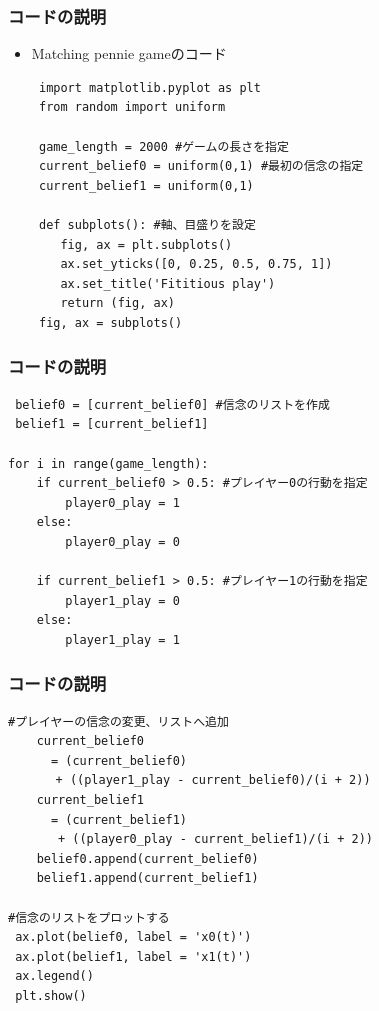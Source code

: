 \documentclass[dvipdfmx,fleqn]{beamer}
\begin{document}
\begin{frame}[containsverbatim]%
\frametitle{コードの説明}
\begin{itemize}\setlength{\parskip}{0.5em}
\item
Matching pennie gameのコード
\begin{verbatim}
 import matplotlib.pyplot as plt
 from random import uniform

 game_length = 2000 #ゲームの長さを指定
 current_belief0 = uniform(0,1) #最初の信念の指定
 current_belief1 = uniform(0,1)

 def subplots(): #軸、目盛りを設定
    fig, ax = plt.subplots()
    ax.set_yticks([0, 0.25, 0.5, 0.75, 1])
    ax.set_title('Fititious play')
    return (fig, ax)
 fig, ax = subplots() 

\end{verbatim}
\end{itemize}
\end{frame}

\begin{frame}[containsverbatim]
\frametitle{コードの説明}

\begin{verbatim}
 belief0 = [current_belief0] #信念のリストを作成
 belief1 = [current_belief1]

for i in range(game_length):
    if current_belief0 > 0.5: #プレイヤー0の行動を指定
        player0_play = 1
    else:
        player0_play = 0

    if current_belief1 > 0.5: #プレイヤー1の行動を指定
        player1_play = 0
    else:
        player1_play = 1
\end{verbatim}

\end{frame}


\begin{frame}[containsverbatim]
\frametitle{コードの説明}

\begin{verbatim}
#プレイヤーの信念の変更、リストへ追加
    current_belief0 
      = (current_belief0) 
　　　　+ ((player1_play - current_belief0)/(i + 2)) 
    current_belief1 
      = (current_belief1)
　　　  + ((player0_play - current_belief1)/(i + 2)) 
    belief0.append(current_belief0) 
    belief1.append(current_belief1)

#信念のリストをプロットする   
 ax.plot(belief0, label = 'x0(t)')
 ax.plot(belief1, label = 'x1(t)')
 ax.legend()
 plt.show()

\end{verbatim}
\end{frame}
\end{document}
